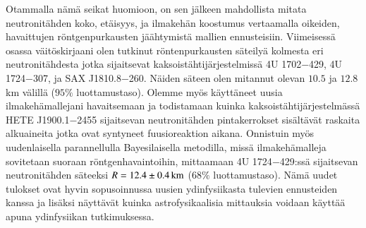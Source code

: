 Otammalla nämä seikat huomioon, on sen jälkeen mahdollista mitata neutronitähden koko, etäisyys, ja ilmakehän koostumus vertaamalla oikeiden, havaittujen röntgenpurkausten jäähtymistä mallien ennusteisiin.
Viimeisessä osassa väitöskirjaani olen tutkinut röntenpurkausten säteilyä kolmesta eri neutronitähdesta jotka sijaitsevat kaksoistähtijärjestelmissä 4U 1702$-$429, 4U 1724$-$307, ja SAX J1810.8$-$260.
Näiden säteen olen mitannut olevan $10.5$ ja $12.8$ km välillä ($95\%$ luottamustaso).
Olemme myös käyttäneet uusia ilmakehämallejani havaitsemaan ja todistamaan kuinka kaksoistähtijärjestelmässä HETE J1900.1$-$2455 sijaitsevan neutronitähden pintakerrokset sisältävät raskaita alkuaineita jotka ovat syntyneet fuusioreaktion aikana.
Onnistuin myös uudenlaisella parannellulla Bayesilaisella metodilla, missä ilmakehämalleja sovitetaan suoraan röntgenhavaintoihin, mittaamaan 4U 1724$-$429:ssä sijaitsevan neutronitähden säteeksi $R=12.4 \pm 0.4\, \mathrm{km}$ ($68\%$ luottamustaso).
Nämä uudet tulokset ovat hyvin sopusoinnussa uusien ydinfysiikasta tulevien ennusteiden kanssa ja lisäksi näyttävät kuinka astrofysikaalisia mittauksia voidaan käyttää apuna ydinfysiikan tutkimuksessa.

